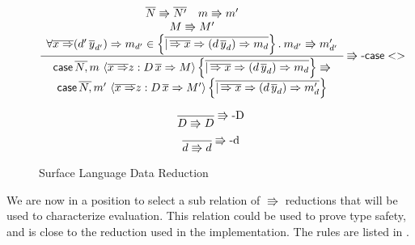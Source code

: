 \begin{figure}
\[
\frac{\begin{array}{c}
\overline{N}\Rrightarrow\overline{N'}\quad m\Rrightarrow m'\\
M\Rrightarrow M'\\
\forall\overline{x\Rightarrow}(d'\,\overline{y}_{d'})\Rightarrow m_{d'}\in\left\{ \overline{|\,\overline{\Rightarrow x}\Rightarrow(d\,\overline{y}_{d})\Rightarrow m_{d}}\right\} .\:m_{d'}\Rrightarrow m'_{d'}
\end{array}}{\begin{array}{c}
\mathsf{case}\,\overline{N,}\,m\,\left\langle \overline{x\Rightarrow}z:D\,\overline{x}\Rightarrow M\right\rangle \left\{ \overline{|\,\overline{\Rightarrow x}\Rightarrow(d\,\overline{y}_{d})\Rightarrow m_{d}}\right\} \Rrightarrow\\
\mathsf{case}\,\overline{N,}\,m'\,\left\langle \overline{x\Rightarrow}z:D\,\overline{x}\Rightarrow M'\right\rangle \left\{ \overline{|\,\overline{\Rightarrow x}\Rightarrow(d\,\overline{y}_{d})\Rightarrow m'_{d}}\right\} 
\end{array}
}\operatorname{\Rrightarrow-\mathsf{case}{}<>} 
\]

\[
\frac{\,}{D\Rrightarrow D}\operatorname{\Rrightarrow-D}
\]
\[
\frac{\,}{d\Rrightarrow d}\operatorname{\Rrightarrow-d}
\]
\caption{Surface Language Data Reduction}
\label{fig:surface-data-red}
\end{figure}

We are now in a position to select a sub relation of $\Rrightarrow$ reductions that will be used to characterize \cbv{} evaluation.
This relation could be used to prove type safety, and is close to the reduction used in the implementation.
The rules are listed in .

